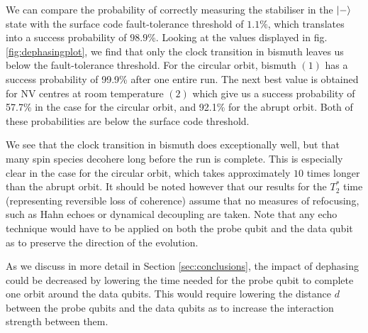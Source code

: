 We can compare the probability of correctly measuring the stabiliser in the $\ket{-}$ state with the surface code fault-tolerance threshold of $1.1\%$, which translates into a success probability of $98.9$\%. Looking at the values displayed in fig.\@ \ref{fig:dephasingplot}, we find that only the clock transition in bismuth leaves us below the fault-tolerance threshold. For the circular orbit, bismuth $(1)$ has a success probability of  99.9\% after one entire run. The next best value is obtained for NV centres at room temperature $(2)$ which give us a success probability of 57.7\% in the case for the circular orbit, and 92.1\% for the abrupt orbit. Both of these probabilities are below the surface code threshold. 

We see that the clock transition in bismuth does exceptionally well, but that many spin species decohere long before the run is complete. This is especially clear in the case for the circular orbit, which takes approximately $10$ times longer than the abrupt orbit. It should be noted however that our results for the $T_2^*$ time (representing reversible loss of coherence) assume that no measures of refocusing, such as Hahn echoes \cite{levitt1979nmr} or dynamical decoupling \cite{viola1998dynamical} are taken. Note that any echo technique would have to be applied on both the probe qubit and the data qubit as to preserve the direction of the evolution. 

As we discuss in more detail in Section \ref{sec:conclusions}, the impact of dephasing could be decreased by lowering the time needed for the probe qubit to complete one orbit around the data qubits. This would require lowering the distance $d$ between the probe qubits and the data qubits as to increase the interaction strength between them. 





